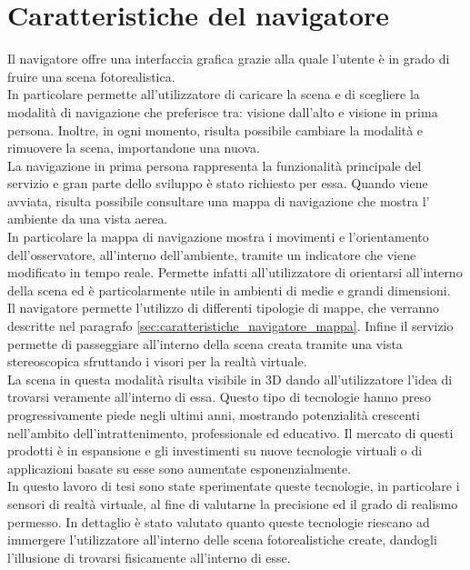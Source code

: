 \section{Caratteristiche del navigatore}
\label{sec:chapter_navigazione_scena_caratt_navigat}

Il navigatore offre una interfaccia grafica grazie alla quale l’utente è in grado di fruire una scena fotorealistica.
\\
In particolare permette all’utilizzatore di caricare la scena e di scegliere la modalità di navigazione che preferisce tra: visione dall’alto e visione in prima persona. 
Inoltre, in ogni momento, risulta possibile cambiare la modalità e rimuovere la scena, importandone una nuova.
\\
La navigazione in prima persona rappresenta la funzionalità principale del servizio e gran parte dello sviluppo è stato richiesto per essa.
Quando viene avviata, risulta possibile consultare una mappa di navigazione che mostra l’ ambiente da una vista aerea.
\\
In particolare la mappa di navigazione mostra i movimenti e l’orientamento dell’osservatore, all’interno dell’ambiente, tramite un indicatore che viene modificato in tempo reale. 
Permette infatti all’utilizzatore di orientarsi all’interno della scena ed è particolarmente utile in ambienti di medie e grandi dimensioni.
\\
Il navigatore permette l’utilizzo di differenti tipologie di mappe, che verranno descritte nel paragrafo \ref{sec:caratteristiche_navigatore_mappa}.
Infine il servizio permette di passeggiare all’interno della scena creata tramite una vista stereoscopica sfruttando i visori per la realtà virtuale. 
\\
La scena in questa modalità risulta visibile in 3D dando all’utilizzatore l’idea di trovarsi veramente all’interno di essa.
Questo tipo di tecnologie hanno preso progressivamente piede negli ultimi anni, mostrando potenzialità crescenti nell’ambito dell’intrattenimento, professionale ed educativo.
Il mercato di questi prodotti è in espansione e gli investimenti su nuove tecnologie virtuali o di applicazioni basate su esse sono aumentate esponenzialmente. 
\\
In questo lavoro di tesi sono state sperimentate queste tecnologie, in particolare i sensori di realtà virtuale, al fine di valutarne la precisione ed il grado di realismo permesso. 
In dettaglio è stato valutato quanto queste tecnologie riescano ad immergere l’utilizzatore all’interno delle scena fotorealistiche create, dandogli l’illusione di trovarsi fisicamente all’interno di esse.

